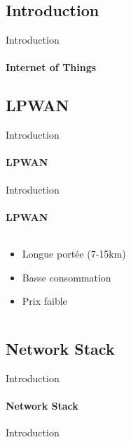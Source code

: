 \subsection{Introduction}

\begin{frame}{Introduction}
\framesubtitle{Internet of Things}

\end{frame}

\subsection{LPWAN}

\begin{frame}{Introduction}
\framesubtitle{LPWAN}

\end{frame}

\begin{frame}{Introduction}
\framesubtitle{LPWAN}
\begin{columns}
  \begin{column}{0.5\textwidth}
  \begin{itemize}
    \item Longue portée (7-15km)
    \item Basse consommation
    \item Prix faible
  \end{itemize}
  \end{column}
  \begin{column}{0.5\textwidth}
      
  \end{column}
\end{columns}
\end{frame}

\subsection{Network Stack}

\begin{frame}{Introduction}
\framesubtitle{Network Stack}

\end{frame}

\begin{frame}{Introduction}
\framesubtitle{}
\end{frame}
